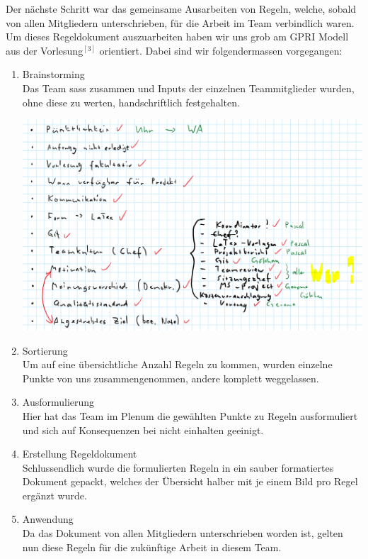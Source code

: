 \documentclass[12pt]{article}
\begin{document}
Der nächste Schritt war das gemeinsame Ausarbeiten von Regeln, welche, sobald von allen Mitgliedern unterschrieben, für die Arbeit im Team verbindlich waren. Um dieses Regeldokument auszuarbeiten haben wir uns grob am GPRI Modell aus der Vorlesung$^{[3]}$ orientiert. Dabei sind wir folgendermassen vorgegangen:
\begin{enumerate}
\item Brainstorming\\
Das Team sass zusammen und Inputs der einzelnen Teammitglieder wurden, ohne diese zu werten, handschriftlich festgehalten.
\begin{center}
\includegraphics[scale=0.3]{regelnHand}
\end{center}
\item Sortierung\\
Um auf eine übersichtliche Anzahl Regeln zu kommen, wurden einzelne Punkte von uns zusammengenommen, andere komplett weggelassen.
\item Ausformulierung\\
Hier hat das Team im Plenum die gewählten Punkte zu Regeln ausformuliert und sich auf Konsequenzen bei nicht einhalten geeinigt.
\item Erstellung Regeldokument\\
Schlussendlich wurde die formulierten Regeln in ein sauber formatiertes Dokument gepackt, welches der Übersicht halber mit je einem Bild pro Regel ergänzt wurde.
\item Anwendung\\
Da das Dokument von allen Mitgliedern unterschrieben worden ist, gelten nun diese Regeln für die zukünftige Arbeit in diesem Team.

\end{enumerate}
\end{document}

